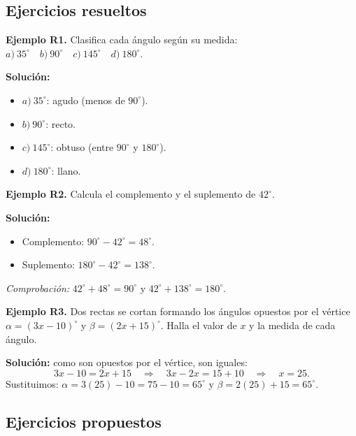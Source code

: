 \documentclass[12pt, letterpaper]{article}
\begin{document}
\newpage %

\subsection{Ejercicios resueltos}

\textbf{Ejemplo R1.} Clasifica cada ángulo según su medida: $a)\ 35^{\circ} \quad b)\ 90^{\circ} \quad c)\ 145^{\circ} \quad d)\ 180^{\circ}$.

\begin{cuadrosolucion}
  \textbf{Solución:}
  \begin{itemize}
    \item $a)\ 35^{\circ}$: agudo (menos de $90^{\circ}$).
    \item $b)\ 90^{\circ}$: recto.
    \item $c)\ 145^{\circ}$: obtuso (entre $90^{\circ}$ y $180^{\circ}$).
    \item $d)\ 180^{\circ}$: llano.
  \end{itemize}
\end{cuadrosolucion}

\textbf{Ejemplo R2.} Calcula el complemento y el suplemento de $42^{\circ}$.

\begin{cuadrosolucion}
  \textbf{Solución:}
  \begin{itemize}
    \item Complemento: $90^{\circ} - 42^{\circ} = 48^{\circ}$.
    \item Suplemento: $180^{\circ} - 42^{\circ} = 138^{\circ}$.
  \end{itemize}
  \emph{Comprobación:} $42^{\circ} + 48^{\circ} = 90^{\circ}$ y $42^{\circ} + 138^{\circ} = 180^{\circ}$. \checkmark
\end{cuadrosolucion}

\textbf{Ejemplo R3.} Dos rectas se cortan formando los ángulos opuestos por el vértice $\alpha = (3x - 10)^{\circ}$ y $\beta = (2x + 15)^{\circ}$. Halla el valor de $x$ y la medida de cada ángulo.

\begin{cuadrosolucion}
  \textbf{Solución:} como son opuestos por el vértice, son iguales:
  $$3x - 10 = 2x + 15 \quad \Rightarrow \quad 3x - 2x = 15 + 10 \quad \Rightarrow \quad x = 25.$$
  Sustituimos: $\alpha = 3(25) - 10 = 75 - 10 = 65^{\circ}$ y $\beta = 2(25) + 15 = 65^{\circ}$. \checkmark
\end{cuadrosolucion}

\subsection{Ejercicios propuestos}
\end{document}
